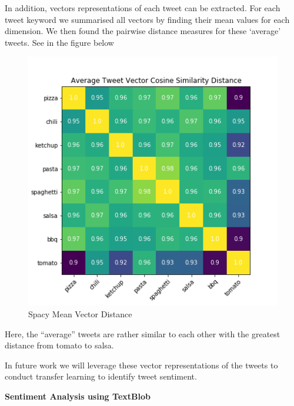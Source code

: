 \documentclass[12pt,oneside]{chicagocapstone}
\begin{document}
In addition, vectors representations of each tweet can be extracted. For
each tweet keyword we summarised all vectors by finding their mean
values for each dimension. We then found the pairwise distance measures
for these `average' tweets. See in the figure below
\begin{figure}
\centering
\includegraphics{./figure/Tweet_Distance_Spacy.png}
\caption{Spacy Mean Vector Distance}
\end{figure}
Here, the ``average'' tweets are rather similar to each other with the
greatest distance from tomato to salsa.

In future work we will leverage these vector representations of the
tweets to conduct transfer learning to identify tweet sentiment.

\textbf{Sentiment Analysis using TextBlob}
\end{document}
